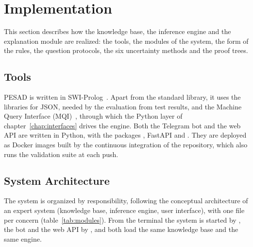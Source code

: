 \section{Implementation}
\label{sec:implementation}

This section describes how the knowledge base, the inference engine and the
explanation module are realized: the tools, the modules of the system, the
form of the rules, the question protocols, the six uncertainty methods and the
proof trees.

\subsection{Tools}

PESAD is written in SWI-Prolog~\cite{swipl}. Apart from the standard library,
it uses the libraries for JSON, needed by the evaluation from test results, and
the Machine Query Interface (MQI)~\cite{swipl-mqi}, through which the Python
layer of chapter~\ref{chap:interfaces} drives the engine. Both the
Telegram bot and the web API are written in Python, with the packages
, FastAPI and . They are deployed as
Docker images built by the continuous integration of the repository, which also
runs the validation suite at each push.

\subsection{System Architecture}

The system is organized by responsibility, following the conceptual
architecture of an expert system (knowledge base, inference engine, user
interface), with one file per concern (table~\ref{tab:modules}). From the terminal the system is started by , the bot and the
web API by , and both load the same knowledge base and the
same engine.

